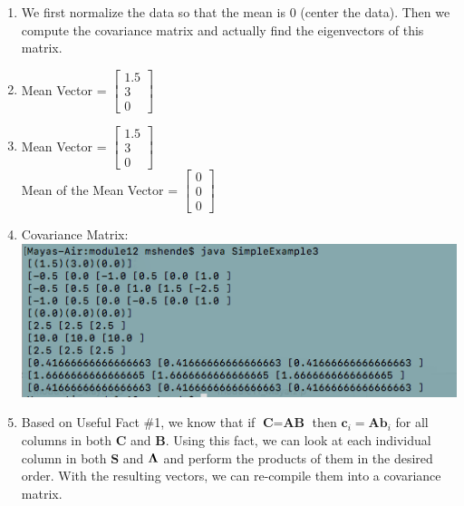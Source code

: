 \documentclass{article}
\begin{document}
\begin{enumerate}
\item We first normalize the data so that the mean is 0 (center the data). Then we compute the covariance matrix and actually find the eigenvectors of this matrix. 

\item Mean Vector = $\begin{bmatrix}1.5\\3\\0\end{bmatrix}$

\item Mean Vector = $\begin{bmatrix}1.5\\3\\0\end{bmatrix}$\\
	Mean of the Mean Vector = $\begin{bmatrix}0\\0\\0\end{bmatrix}$

\item Covariance Matrix: \\
\includegraphics[scale=0.5]{exercise17}

\item Based on Useful Fact \#1, we know that if $\textbf{C} = \textbf{AB}$ then $\textbf{c}_i = \textbf{A}\textbf{b}_i$ for all columns in both $\textbf{C}$ and $\textbf{B}$. Using this fact, we can look at each individual column in both $\textbf{S}$ and ${\bf \Lambda}$ and perform the products of them in the desired order. With the resulting vectors, we can re-compile them into a covariance matrix.


\end{enumerate}
\end{document}
